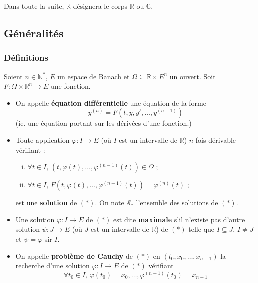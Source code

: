 




	Dans toute la suite, $\mathbb{K}$ désignera le corps $\mathbb{R}$ ou $\mathbb{C}$.

	\subsection{Généralités}

	\subsubsection{Définitions}


	\begin{definition}
		Soient $n \in \mathbb{N}^*$, $E$ un espace de Banach et $\Omega \subseteq \mathbb{R} \times E^n$ un ouvert. Soit $F : \Omega \times \mathbb{R}^n \rightarrow E$ une fonction.
		\begin{itemize}
			\item On appelle \textbf{équation différentielle} une équation de la forme
			\[ y^{(n)} = F(t, y, y', \dots, y^{(n-1)}) \tag{$*$} \]
			(ie. une équation portant sur les dérivées d'une fonction.)
			\item Toute application $\varphi : I \rightarrow E$ (où $I$ est un intervalle de $\mathbb{R}$) $n$ fois dérivable vérifiant :
			\begin{enumerate}[(i)]
				\item $\forall t \in I, \, (t, \varphi(t), \dots, \varphi^{(n-1)}(t)) \in \Omega$ ;
				\item $\forall t \in I, \, F(t, \varphi(t), \dots, \varphi^{(n-1)}(t)) = \varphi^{(n)}(t)$ ;
			\end{enumerate}
			est une \textbf{solution} de $(*)$. On note $\mathcal{S}_*$ l'ensemble des solutions de $(*)$.
			\item Une solution $\varphi : I \rightarrow E$ de $(*)$ est dite \textbf{maximale} s'il n'existe pas d'autre solution $\psi : J \rightarrow E$ (où $J$ est un intervalle de $\mathbb{R}$) de $(*)$ telle que $I \subseteq J$, $I \neq J$ et $\psi = \varphi$ sir $I$.
			\item On appelle \textbf{problème de Cauchy} de $(*)$ en $(t_0, x_0, \dots, x_{n-1})$ la recherche d'une solution $\varphi : I \rightarrow E$ de $(*)$ vérifiant
			\[ \forall t_0 \in I, \, \varphi(t_0) = x_0, \dots, \varphi^{(n-1)}(t_0) = x_{n-1} \]
		\end{itemize}
	\end{definition}

